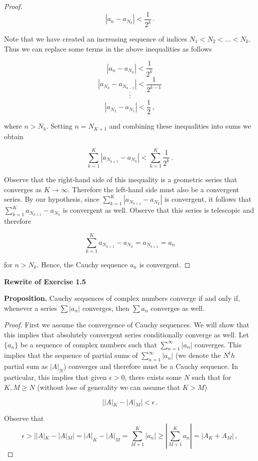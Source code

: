 \documentclass[a4paper]{article}
\newcommand {\m} {\cdot}
\numberwithin{equation}{section}
\begin{document}
\begin{description}
\begin{proof}
$$|a_n - a_{N_k}| < \frac{1}{2^k}\,.$$

Note that we have created an increasing sequence of indices $N_1 < N_2 < ... < N_k$. Thus we can replace some terms in the above inequalities as follows

	$$|a_n - a_{N_k}| < \frac{1}{2^k}$$
	$$|a_{N_k} - a_{N_{k-1}}| < \frac{1}{2^{k-1}}$$
	$$\m$$
	$$\m$$
	$$\m$$
	$$|a_{N_2} - a_{N_{1}}| < \frac{1}{2}\,,$$
	
	where $n > N_k$. Setting $n = N_{K+1}$ and  combining these inequalities into sums we obtain
	
	$$\sum_{k=1}^K |a_{N_{k+1}} - a_{N_{k}}| < \sum_{k=1}^K \frac{1}{2^k}\,.$$
	
	Observe that the right-hand side of this inequality is a geometric series that converges as $K \rightarrow \infty$. Therefore the left-hand side must also be a convergent series. By our hypothesis, since $\sum_{k=1}^K |a_{N_{k+1}} - a_{N_{k}}|$ is convergent, it follows that $\sum_{k=1}^K a_{N_{k+1}} - a_{N_{k}}$ is convergent as well.  Observe that this series is telescopic and therefore
	
	$$\sum_{k=1}^K a_{N_{k+1}} - a_{N_{k}} = a_{N_{k+1}} = a_n$$
	
	for $n > N_{k}$. Hence, the Cauchy sequence ${a_n}$ is convergent.

\end{proof}

\item \textbf{Rewrite of Exercise 1.5} 

\textbf{Proposition.} Cauchy sequences of complex numbers converge if and only if, whenever a series $\sum |a_n|$ converges, then $\sum a_n$ converges as well.

\begin{proof} First we assume the convergence of Cauchy sequences. We will show that this implies that absolutely convergent series conditionally converge as well. Let $\lbrace a_n \rbrace$ be a sequence of complex numbers such that $\sum_{n=1}^\infty |a_n|$ converges. This implies that the sequence of partial sums of $\sum_{n=1}^\infty |a_n|$ (we denote the $N^th$ partial sum as $|A|_N$) converges and therefore must be a Cauchy sequence. In particular, this implies that given $\epsilon > 0$, there exists some $N$ such that for $K,M \geq N$ (without lose of generality we can assume that $K > M$) 

	$$||A|_K - |A|_M| < \epsilon\,.$$
	
	Observe that 
	$$\epsilon > ||A|_K - |A|_M| = |A|_K - |A|_M = \sum_{M+1}^K |a_n| \geq |\sum_{M+1}^K a_n| = |A_K +A_M|\,,$$
	

\end{proof}
\end{description}
\end{document}
